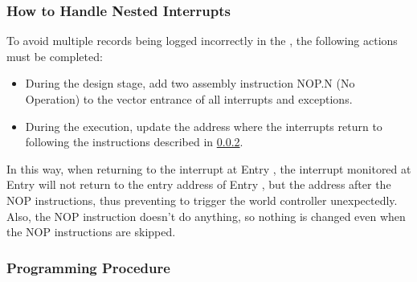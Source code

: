 \documentclass[main\_\_EN.tex]{subfiles}
\begin{document}
\subsubsection{How to Handle Nested Interrupts}

To avoid multiple records being logged incorrectly in the , the following actions must be completed:

\begin{itemize}
    \item During the design stage, add two assembly instruction NOP.N (No Operation) to the vector entrance of all interrupts and exceptions.
    \item During the execution, update the address where the interrupts return to following the instructions described in \ref{sec:wctrl-prog-step}.
\end{itemize}

In this way, when returning to the interrupt at Entry , the interrupt monitored at Entry  will not return to the entry address of Entry , but the address after the NOP instructions, thus preventing to trigger the world controller unexpectedly. Also, the NOP instruction doesn't do anything, so nothing is changed even when the NOP instructions are skipped.

\subsubsection{Programming Procedure}\label{sec:wctrl-prog-step}
\end{document}
